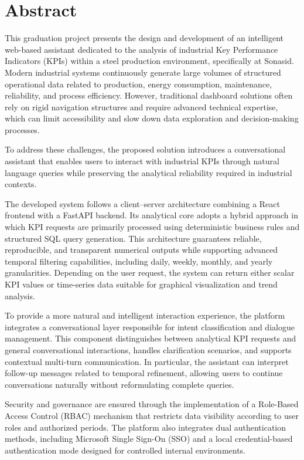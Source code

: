 \chapter*{Abstract}
This graduation project presents the design and development of an intelligent web-based assistant dedicated to the analysis of industrial Key Performance Indicators (KPIs) within a steel production environment, specifically at Sonasid. Modern industrial systems continuously generate large volumes of structured operational data related to production, energy consumption, maintenance, reliability, and process efficiency. However, traditional dashboard solutions often rely on rigid navigation structures and require advanced technical expertise, which can limit accessibility and slow down data exploration and decision-making processes.

To address these challenges, the proposed solution introduces a conversational assistant that enables users to interact with industrial KPIs through natural language queries while preserving the analytical reliability required in industrial contexts.

The developed system follows a client--server architecture combining a React frontend with a FastAPI backend. Its analytical core adopts a hybrid approach in which KPI requests are primarily processed using deterministic business rules and structured SQL query generation. This architecture guarantees reliable, reproducible, and transparent numerical outputs while supporting advanced temporal filtering capabilities, including daily, weekly, monthly, and yearly granularities. Depending on the user request, the system can return either scalar KPI values or time-series data suitable for graphical visualization and trend analysis.

To provide a more natural and intelligent interaction experience, the platform integrates a conversational layer responsible for intent classification and dialogue management. This component distinguishes between analytical KPI requests and general conversational interactions, handles clarification scenarios, and supports contextual multi-turn communication. In particular, the assistant can interpret follow-up messages related to temporal refinement, allowing users to continue conversations naturally without reformulating complete queries.

Security and governance are ensured through the implementation of a Role-Based Access Control (RBAC) mechanism that restricts data visibility according to user roles and authorized periods. The platform also integrates dual authentication methods, including Microsoft Single Sign-On (SSO) and a local credential-based authentication mode designed for controlled internal environments.

